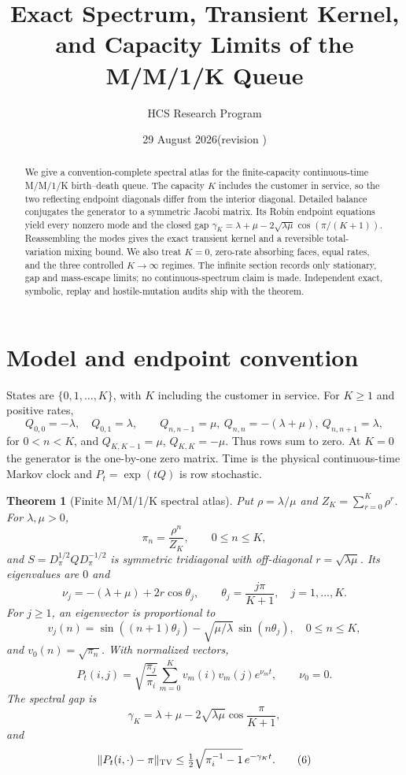 \documentclass[11pt]{article}
\title{Exact Spectrum, Transient Kernel, and Capacity Limits of the M/M/1/K Queue}
\author{HCS Research Program}
\date{29 August 2026\quad (revision \CRevisionRound)}
\newtheorem{theorem}{Theorem}
\begin{document}
\maketitle

\begin{abstract}
We give a convention-complete spectral atlas for the finite-capacity
continuous-time M/M/1/K birth--death queue.  The capacity $K$ includes the
customer in service, so the two reflecting endpoint diagonals differ from the
interior diagonal.  Detailed balance conjugates the generator to a symmetric
Jacobi matrix.  Its Robin endpoint equations yield every nonzero mode and the
closed gap
$\gamma_K=\lambda+\mu-2\sqrt{\lambda\mu}\cos(\pi/(K+1))$.  Reassembling the
modes gives the exact transient kernel and a reversible total-variation
mixing bound.  We also treat $K=0$, zero-rate absorbing faces, equal rates,
and the three controlled $K\to\infty$ regimes.  The infinite section records
only stationary, gap and mass-escape limits; no continuous-spectrum claim is
made.  Independent exact, symbolic, replay and hostile-mutation audits ship
with the theorem.
\end{abstract}

\section{Model and endpoint convention}
States are $\{0,1,\ldots,K\}$, with $K$ including the customer in service.
For $K\geq1$ and positive rates,
\begin{equation}
 Q_{0,0}=-\lambda,\quad Q_{0,1}=\lambda,\qquad
 Q_{n,n-1}=\mu,\ Q_{n,n}=-(\lambda+\mu),\ Q_{n,n+1}=\lambda,
 \label{eq:interior}
\end{equation}
for $0<n<K$, and $Q_{K,K-1}=\mu$, $Q_{K,K}=-\mu$.  Thus rows sum to zero.
At $K=0$ the generator is the one-by-one zero matrix.  Time is the physical
continuous-time Markov clock and $P_t=\exp(tQ)$ is row stochastic.

\begin{theorem}[Finite M/M/1/K spectral atlas]\label{thm:atlas}
Put $\rho=\lambda/\mu$ and $Z_K=\sum_{r=0}^K\rho^r$.  For $\lambda,\mu>0$,
\[
 \pi_n=\frac{\rho^n}{Z_K},\qquad 0\leq n\leq K,
\]
and $S=D_\pi^{1/2}QD_\pi^{-1/2}$ is symmetric tridiagonal with off-diagonal
$r=\sqrt{\lambda\mu}$.  Its eigenvalues are $0$ and
\[
 \nu_j=-(\lambda+\mu)+2r\cos\theta_j,
 \qquad \theta_j=\frac{j\pi}{K+1},\quad j=1,\ldots,K. \tag{2}
\]
For $j\geq1$, an eigenvector is proportional to
\[
 v_j(n)=\sin((n+1)\theta_j)-\sqrt{\mu/\lambda}\,\sin(n\theta_j),
 \quad 0\leq n\leq K,                                      \tag{3}
\]
and $v_0(n)=\sqrt{\pi_n}$.  With normalized vectors,
\[
 P_t(i,j)=\sqrt{\frac{\pi_j}{\pi_i}}
 \sum_{m=0}^{K}v_m(i)v_m(j)e^{\nu_m t},\qquad \nu_0=0.  \tag{4}
\]
The spectral gap is
\[
 \gamma_K=\lambda+\mu-2\sqrt{\lambda\mu}\cos\frac{\pi}{K+1},       \tag{5}
\]
and
\[
 \|P_t(i,\cdot)-\pi\|_{\rm TV}
 \leq\tfrac12\sqrt{\pi_i^{-1}-1}\,e^{-\gamma_Kt}.                    \tag{6}
\]
\end{theorem}
\end{document}

